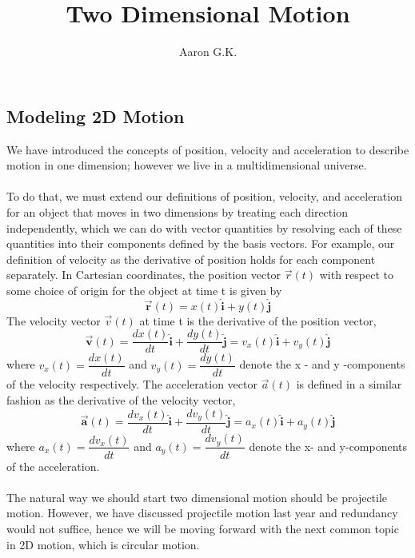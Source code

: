 \documentclass[12pt,addpoints]{exam}
\title{Two Dimensional Motion}
\author{Aaron G.K.}
\begin{document}
	\maketitle
	\begin{center}
		\subsection*{Modeling 2D Motion}
	\end{center}
	We have introduced the concepts of position, velocity and acceleration to describe motion in one dimension; however we live in a multidimensional universe. \\ \\
	To do that, we must extend our definitions of position, velocity, and acceleration for an object that moves in two dimensions by treating each direction independently, which we can do with vector quantities by resolving each of these quantities into their components defined by the basis vectors. For example, our definition of velocity as the derivative of position holds for each component separately. In Cartesian coordinates, the position vector $\vec r(t)$ with respect to some choice of origin for the object at time t is given by
	$$\overrightarrow{\mathbf{r}}(t)=x(t) \hat{\mathbf{i}}+y(t) \hat{\mathbf{j}}$$
	The velocity vector $\vec v(t)$ at time t is the derivative of the position vector, 
	$$\overrightarrow{\mathbf{v}}(t)=\frac{d x(t)}{d t} \hat{\mathbf{i}}+\frac{d y(t)}{d t} \hat{\mathbf{j}} = v_{x}(t) \hat{\mathbf{i}}+v_{y}(t) \hat{\mathbf{j}} \nonumber$$
	where $v_{x}(t) =\dfrac{dx(t)}{dt}$ and $v_{y}(t) = \dfrac{dy(t)}{dt}$ denote the x - and y -components of the velocity respectively.
	The acceleration vector $\vec a(t)$ is defined in a similar fashion as the derivative of the velocity vector,
	$$\overrightarrow{\mathbf{a}}(t)=\frac{d v_{x}(t)}{d t} \hat{\mathbf{i}}+\frac{d v_{y}(t)}{d t} \hat{\mathbf{j}} = a_{x}(t) \hat{\mathbf{i}}+a_{y}(t) \hat{\mathbf{j}}$$
	where $a_x(t)=\dfrac{dv_x(t)}{dt}$ and $a_y(t)=\dfrac{dv_y(t)}{dt}$ denote the x- and y-components of the acceleration. \\ \\
	The natural way we should start two dimensional motion should be projectile motion. However, we have discussed projectile motion last year and redundancy would not suffice, hence we will be moving forward with the next common topic in 2D motion, which is circular motion.
\end{document}
